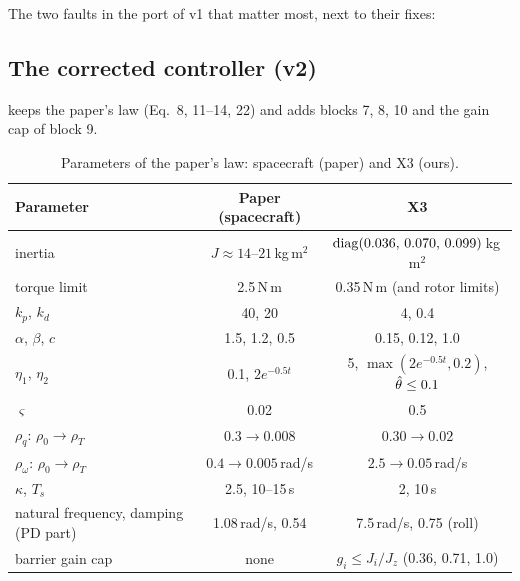 The two faults in the port of v1 that matter most, next to their fixes:

\subsection{The corrected controller (v2)}

 keeps the paper's law (Eq.~8, 11--14, 22) and adds blocks 7, 8, 10 and the gain cap of block 9.

\begin{table}[H]
\centering\small
\caption{Parameters of the paper's law: spacecraft (paper) and X3 (ours).}
\label{tab:x3params}
\begin{tabular}{@{}lcc@{}}
\toprule
\textbf{Parameter} & \textbf{Paper (spacecraft)} & \textbf{X3}\\
\midrule
inertia & $J\approx14$--$21$\,kg\,m$^2$ & $\operatorname{diag}(0.036,\,0.070,\,0.099)$\,kg\,m$^2$\\
torque limit & 2.5\,N\,m & 0.35\,N\,m (and rotor limits)\\
$k_p$, $k_d$ & 40, 20 & 4, 0.4\\
$\alpha$, $\beta$, $c$ & 1.5, 1.2, 0.5 & 0.15, 0.12, 1.0\\
$\eta_1$, $\eta_2$ & 0.1, $2e^{-0.5t}$ & 5, $\max(2e^{-0.5t},0.2)$, $\hat{\theta}\le0.1$\\
$\varsigma$ & 0.02 & 0.5\\
$\rho_q$: $\rho_0\to\rho_T$ & $0.3\to0.008$ & $0.30\to0.02$\\
$\rho_\omega$: $\rho_0\to\rho_T$ & $0.4\to0.005$\,rad/s & $2.5\to0.05$\,rad/s\\
$\kappa$, $T_s$ & 2.5, 10--15\,s & 2, 10\,s\\
natural frequency, damping (PD part) & 1.08\,rad/s, 0.54 & 7.5\,rad/s, 0.75 (roll)\\
barrier gain cap & none & $g_i\le J_i/J_z$ (0.36, 0.71, 1.0)\\
\bottomrule
\end{tabular}
\end{table}

